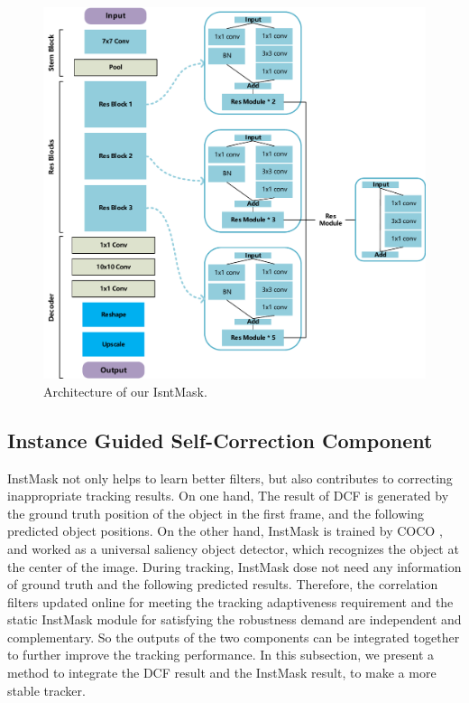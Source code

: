 \documentclass[review]{elsarticle}
\begin{document}
\begin{CJK*}{UTF8}{gbsn}
\begin{figure}
    \centering
    \includegraphics[width=12cm]{images/net.pdf}
    \caption{Architecture of our IsntMask.}
    \label{fig:net}
\end{figure}

\subsection{Instance Guided Self-Correction Component} \label{sec:cog}
InstMask not only helps to learn better filters, but also contributes to correcting inappropriate tracking results. On one hand, The result of DCF is generated by the ground truth position of the object in the first frame, and the following predicted object positions. On the other hand,  InstMask is trained by COCO \cite{Lin2014MicrosoftCC}, and worked as a universal saliency object detector, which recognizes the object at the center of the image. During tracking, InstMask dose not need any information of ground truth and the following predicted results. Therefore, the correlation filters updated online for meeting the tracking adaptiveness requirement and the static InstMask module for satisfying the robustness demand are independent and complementary. So the outputs of the two components can be integrated together to further improve the tracking performance. In this subsection, we present a method to integrate the DCF result and the InstMask result, to make a more stable tracker.


\end{CJK*}
\end{document}
